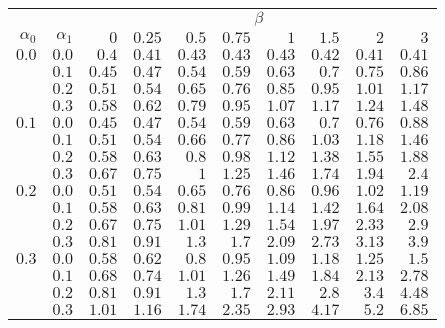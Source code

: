 \begin{tabular}{rr|rrrrrrrr}
\hline\hline
 && \multicolumn{8}{c}{$\beta$}\\
 $\alpha_0$ & $\alpha_1$ & $0$ & $0.25$ & $0.5$ & $0.75$ & $1$ & $1.5$ & $2$ & $3$ \\ 
 \hline
$0.0$ & $0.0$ & $0.4$ & $0.41$ & $0.43$ & $0.43$ & $0.43$ & $0.42$ & $0.41$ & $0.41$\\ 
 & $0.1$ & $0.45$ & $0.47$ & $0.54$ & $0.59$ & $0.63$ & $0.7$ & $0.75$ & $0.86$\\ 
 & $0.2$ & $0.51$ & $0.54$ & $0.65$ & $0.76$ & $0.85$ & $0.95$ & $1.01$ & $1.17$\\ 
 & $0.3$ & $0.58$ & $0.62$ & $0.79$ & $0.95$ & $1.07$ & $1.17$ & $1.24$ & $1.48$\\ 
\hline 
 $0.1$ & $0.0$ & $0.45$ & $0.47$ & $0.54$ & $0.59$ & $0.63$ & $0.7$ & $0.76$ & $0.88$\\ 
 & $0.1$ & $0.51$ & $0.54$ & $0.66$ & $0.77$ & $0.86$ & $1.03$ & $1.18$ & $1.46$\\ 
 & $0.2$ & $0.58$ & $0.63$ & $0.8$ & $0.98$ & $1.12$ & $1.38$ & $1.55$ & $1.88$\\ 
 & $0.3$ & $0.67$ & $0.75$ & $1$ & $1.25$ & $1.46$ & $1.74$ & $1.94$ & $2.4$\\ 
\hline 
 $0.2$ & $0.0$ & $0.51$ & $0.54$ & $0.65$ & $0.76$ & $0.86$ & $0.96$ & $1.02$ & $1.19$\\ 
 & $0.1$ & $0.58$ & $0.63$ & $0.81$ & $0.99$ & $1.14$ & $1.42$ & $1.64$ & $2.08$\\ 
 & $0.2$ & $0.67$ & $0.75$ & $1.01$ & $1.29$ & $1.54$ & $1.97$ & $2.33$ & $2.9$\\ 
 & $0.3$ & $0.81$ & $0.91$ & $1.3$ & $1.7$ & $2.09$ & $2.73$ & $3.13$ & $3.9$\\ 
\hline 
 $0.3$ & $0.0$ & $0.58$ & $0.62$ & $0.8$ & $0.95$ & $1.09$ & $1.18$ & $1.25$ & $1.5$\\ 
 & $0.1$ & $0.68$ & $0.74$ & $1.01$ & $1.26$ & $1.49$ & $1.84$ & $2.13$ & $2.78$\\ 
 & $0.2$ & $0.81$ & $0.91$ & $1.3$ & $1.7$ & $2.11$ & $2.8$ & $3.4$ & $4.48$\\ 
 & $0.3$ & $1.01$ & $1.16$ & $1.74$ & $2.35$ & $2.93$ & $4.17$ & $5.2$ & $6.85$\\ 
 \hline 
 \end{tabular}